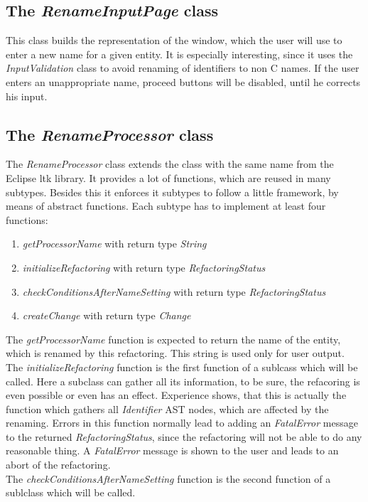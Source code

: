 \documentclass[a4paper,10pt]{report}
\begin{document}
\subsection{The {\it RenameInputPage} class}
This class builds the representation of the window, which the user will use to enter a new name for a given entity.
It is especially interesting, since it uses the {\it InputValidation} class to avoid renaming of identifiers to non C names. If the user enters an unappropriate name, proceed buttons will be disabled, until he corrects his input.

\subsection{The {\it RenameProcessor} class}
The {\it RenameProcessor} class extends the class with the same name from the Eclipse ltk library. It provides a lot of functions, which are reused in many subtypes. Besides this it enforces it subtypes to follow a little framework, by means of abstract functions.
Each subtype has to implement at least four functions:
   \begin{enumerate}
     \item {\it getProcessorName} with return type {\it String}
     \item {\it initializeRefactoring} with return type {\it RefactoringStatus}
     \item {\it checkConditionsAfterNameSetting}  with return type {\it RefactoringStatus}
     \item {\it createChange}  with return type {\it Change}
   \end{enumerate}
The {\it getProcessorName} function is expected to return the name of the entity, which is renamed by this refactoring. This string is used only for user output.\\
The {\it initializeRefactoring} function is the first function of a sublcass which will be called.
Here a subclass can gather all its information, to be sure, the refacoring is even possible or even has an effect.
Experience shows, that this is actually the function which gathers all {\it Identifier} AST nodes, which are affected by the renaming.
Errors in this function normally lead to adding an {\it FatalError} message to the returned {\it RefactoringStatus}, since the refactoring
will not be able to do any reasonable thing. A {\it FatalError} message is shown to the user and leads to an abort of the refactoring.\\
The {\it checkConditionsAfterNameSetting} function is the second function of a sublclass which will be called.
\end{document}
